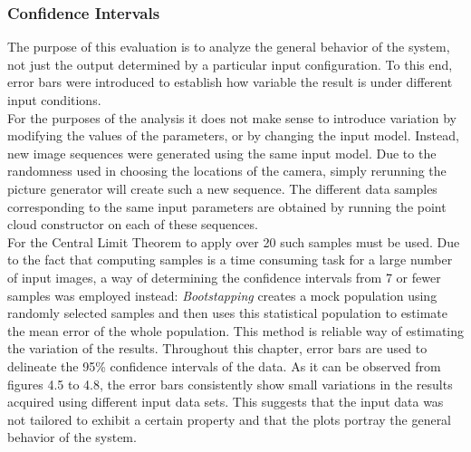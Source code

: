 \documentclass[12pt,a4paper,twoside,openright]{report}
\begin{document}
\subsubsection{Confidence Intervals}
The purpose of this evaluation is to analyze the general behavior of the system, not just the output determined by a particular input configuration. To this end, error bars were introduced to establish how variable the result is under different input conditions. \\
\linebreak
For the purposes of the analysis it does not make sense to introduce variation by modifying the values of the parameters, or by changing the input model. Instead, new image sequences were generated using the same input model. Due to the randomness used in choosing the locations of the camera, simply rerunning the picture generator will create such a new sequence. The different data samples corresponding to the same input parameters are obtained by running the point cloud constructor on each of these sequences.\\
For the Central Limit Theorem to apply over 20 such samples must be used. Due to the fact that computing samples is a time consuming task for a large number of input images, a way of determining the confidence intervals from 7 or fewer samples was employed instead: \emph{Bootstapping} creates a mock population using randomly selected samples and then uses this statistical population to estimate the mean error of the whole population. This method is reliable way of estimating the variation of the results\cite{Mooney+1993}.
\linebreak
Throughout this chapter, error bars are used to delineate the 95\% confidence intervals of the data. As it can be observed from figures 4.5 to 4.8, the error bars consistently show small variations in the results acquired using different input data sets. This suggests that the input data was not tailored to exhibit a certain property and that the plots portray the general behavior of the system.
\end{document}
